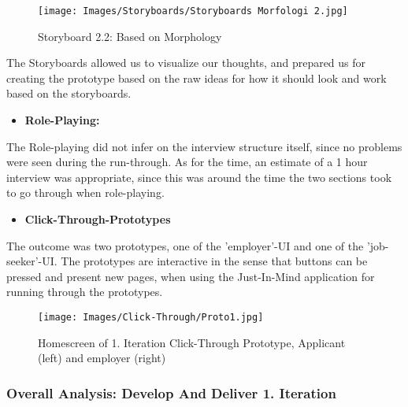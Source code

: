 \begin{figure}[H]
\caption{Storyboard 2.2: Based on Morphology}
\centering
\label{story-morph2}
\texttt{[image: Images/Storyboards/Storyboards Morfologi 2.jpg]}
\end{figure}

The Storyboards allowed us to visualize our thoughts, and prepared us for creating the prototype based on the raw ideas for how it should look and work based on the storyboards.

\newpage

\begin{itemize}
    \item \bf{Role-Playing:}
\end{itemize}

The Role-playing did not infer on the interview structure itself, since no problems were seen during the run-through. As for the time, an estimate of a 1 hour interview was appropriate, since this was around the time the two sections took to go through when role-playing. 

\begin{itemize}
    \item \bf{Click-Through-Prototypes}
\end{itemize}

The outcome was two prototypes, one of the 'employer'-UI and one of the 'job-seeker'-UI. The prototypes are interactive in the sense that buttons can be pressed and present new pages, when using the Just-In-Mind application for running through the prototypes.

\begin{figure}[H]
\centering
\caption{Homescreen of 1. Iteration Click-Through Prototype, Applicant (left) and employer (right)}
\label{click-through1}
{\texttt{[image: Images/Click-Through/Proto1.jpg]}}
\end{figure}

\subsubsection{Overall Analysis: Develop And Deliver 1. Iteration}

